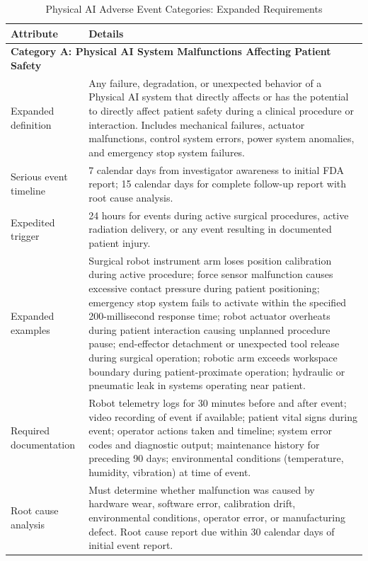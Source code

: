 \newpage

\begin{table}[H]
\centering
\caption{Physical AI Adverse Event Categories: Expanded Requirements}
\label{tab:ae-categories-expanded}
\scriptsize
\begin{tabularx}{\textwidth}{l X}
\toprule
\textbf{Attribute} & \textbf{Details} \\
\midrule
\multicolumn{2}{l}{\textbf{Category A: Physical AI System Malfunctions Affecting Patient Safety}} \\
\midrule
Expanded definition & Any failure, degradation, or unexpected behavior of a Physical AI system that directly affects or has the potential to directly affect patient safety during a clinical procedure or interaction. Includes mechanical failures, actuator malfunctions, control system errors, power system anomalies, and emergency stop system failures. \\
\midrule
Serious event timeline & 7 calendar days from investigator awareness to initial FDA report; 15 calendar days for complete follow-up report with root cause analysis. \\
\midrule
Expedited trigger & 24 hours for events during active surgical procedures, active radiation delivery, or any event resulting in documented patient injury. \\
\midrule
Expanded examples & Surgical robot instrument arm loses position calibration during active procedure; force sensor malfunction causes excessive contact pressure during patient positioning; emergency stop system fails to activate within the specified 200-millisecond response time; robot actuator overheats during patient interaction causing unplanned procedure pause; end-effector detachment or unexpected tool release during surgical operation; robotic arm exceeds workspace boundary during patient-proximate operation; hydraulic or pneumatic leak in systems operating near patient. \\
\midrule
Required documentation & Robot telemetry logs for 30 minutes before and after event; video recording of event if available; patient vital signs during event; operator actions taken and timeline; system error codes and diagnostic output; maintenance history for preceding 90 days; environmental conditions (temperature, humidity, vibration) at time of event. \\
\midrule
Root cause analysis & Must determine whether malfunction was caused by hardware wear, software error, calibration drift, environmental conditions, operator error, or manufacturing defect. Root cause report due within 30 calendar days of initial event report. \\

\end{tabularx}
\end{table}
